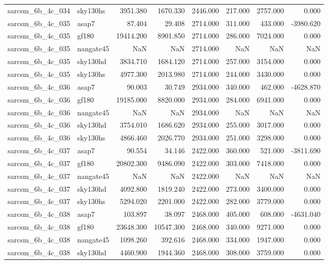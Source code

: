 \begin{tabular}{llrrrrrr}
sarcsm\_6b\_4c\_034 & sky130hs & 3951.380 & 1670.330 & 2446.000 & 217.000 & 2757.000 & 0.000 \\
sarcsm\_6b\_4c\_035 & asap7 & 87.404 & 29.408 & 2714.000 & 311.000 & 433.000 & -3980.620 \\
sarcsm\_6b\_4c\_035 & gf180 & 19414.200 & 8901.850 & 2714.000 & 286.000 & 7024.000 & 0.000 \\
sarcsm\_6b\_4c\_035 & nangate45 & NaN & NaN & 2714.000 & NaN & NaN & NaN \\
sarcsm\_6b\_4c\_035 & sky130hd & 3834.710 & 1684.120 & 2714.000 & 257.000 & 3154.000 & 0.000 \\
sarcsm\_6b\_4c\_035 & sky130hs & 4977.300 & 2013.980 & 2714.000 & 244.000 & 3430.000 & 0.000 \\
sarcsm\_6b\_4c\_036 & asap7 & 90.003 & 30.749 & 2934.000 & 340.000 & 462.000 & -4628.870 \\
sarcsm\_6b\_4c\_036 & gf180 & 19185.000 & 8820.000 & 2934.000 & 284.000 & 6941.000 & 0.000 \\
sarcsm\_6b\_4c\_036 & nangate45 & NaN & NaN & 2934.000 & NaN & NaN & NaN \\
sarcsm\_6b\_4c\_036 & sky130hd & 3754.010 & 1686.620 & 2934.000 & 255.000 & 3017.000 & 0.000 \\
sarcsm\_6b\_4c\_036 & sky130hs & 4866.460 & 2026.770 & 2934.000 & 251.000 & 3298.000 & 0.000 \\
sarcsm\_6b\_4c\_037 & asap7 & 90.554 & 34.146 & 2422.000 & 360.000 & 521.000 & -3811.690 \\
sarcsm\_6b\_4c\_037 & gf180 & 20802.300 & 9486.090 & 2422.000 & 303.000 & 7418.000 & 0.000 \\
sarcsm\_6b\_4c\_037 & nangate45 & NaN & NaN & 2422.000 & NaN & NaN & NaN \\
sarcsm\_6b\_4c\_037 & sky130hd & 4092.800 & 1819.240 & 2422.000 & 273.000 & 3400.000 & 0.000 \\
sarcsm\_6b\_4c\_037 & sky130hs & 5294.020 & 2201.000 & 2422.000 & 282.000 & 3779.000 & 0.000 \\
sarcsm\_6b\_4c\_038 & asap7 & 103.897 & 38.097 & 2468.000 & 405.000 & 608.000 & -4631.040 \\
sarcsm\_6b\_4c\_038 & gf180 & 23648.300 & 10547.300 & 2468.000 & 340.000 & 9271.000 & 0.000 \\
sarcsm\_6b\_4c\_038 & nangate45 & 1098.260 & 392.616 & 2468.000 & 334.000 & 1947.000 & 0.000 \\
sarcsm\_6b\_4c\_038 & sky130hd & 4460.900 & 1944.360 & 2468.000 & 308.000 & 3759.000 & 0.000 \\

\end{tabular}

